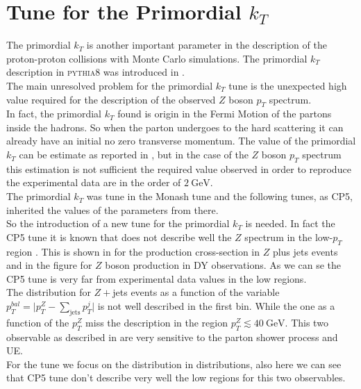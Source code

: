 \chapter{Tune for the Primordial $k_T$}
\label{chap:primordialkTtune}

The primordial $k_T$ is another important parameter in the description of the proton-proton collisions with Monte Carlo simulations. The primordial $k_T$ description in \textsc{pythia8} was introduced in .
\\
The main unresolved problem for the primordial $k_T$ tune is the unexpected high value required for the description of the observed $Z$ boson $p_T$ spectrum.
\\
In fact, the primordial $k_T$ found is origin in the Fermi Motion of the partons inside the hadrons. So when the parton undergoes to the hard scattering it can already have an initial no zero transverse momentum.
The value of the primordial $k_T$ can be estimate as reported in , but in the case of the $Z$ boson $p_T$ spectrum this estimation is not sufficient the required value observed in order to reproduce the experimental data are in the order of $2\ \mathrm{GeV}$.
\\
%
The primordial $k_T$ was tune in the Monash tune \cite{Monash} and the following tunes, as CP5, inherited the values of the parameters from there.
\\
So the introduction of a new tune for the primordial $k_T$ is needed. In fact the CP5 tune it is known that does not describe well the $Z$ spectrum in the low-$p_T$ region \cite{CPtunes}. This is shown in  for the production cross-section in $Z$ plus jets events and in the figure  for $Z$ boson production in DY observations. As we can se the CP5 tune is very far from experimental data values in the low regions. 
\\
The distribution for $Z+$jets events as a function of the variable $p_T^{bal}=\big|p_T^Z-\sum_{\text{jets}}p_T^{j}\big|$ is not well described in the first bin. While the one as a function of the $p_T^Z$ miss the description in the region $p_T^Z \lesssim 40\ \mathrm{GeV}$. This two observable as described in \cite{CPtunes} are very sensitive to the parton shower process and UE.
\\
For the tune we focus on the distribution in  distributions, also here we can see that CP5 tune don't describe very well the low regions for this two observables.  


